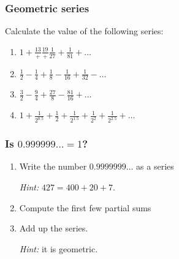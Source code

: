 \documentclass[14pt]{beamer}
\newcommand{\p}{\pause}
\newcommand{\setsize}[1]{\fontsize{#1}{#1}\selectfont} %
\newcommand{\smallerfont}{\setsize{13}} %
\newcommand{\vv}{\vspace{.5cm}}
\begin{document}
	\begin{frame}[t]
		\smallerfont
		\frametitle{Geometric series}

		Calculate the value of the following series:

		\begin{enumerate}
			\item ${\displaystyle 1 + \frac{13}{+} \frac{19}{+} \frac{1}{27} + \frac{1}{81} + \ldots}$
				\vv

			\item ${\displaystyle \frac{1}{2} - \frac{1}{4} + \frac{1}{8} - \frac{1}{16} + \frac{1}{32} - \ldots}$
				\vv

			\item ${\displaystyle \frac{3}{2} - \frac{9}{4} + \frac{27}{8} - \frac{81}{16} + \ldots}$
				\vv

			\item ${\displaystyle  1 + \frac{1}{2^{0.5}} + \frac{1}{2} + \frac{1}{2^{1.5}} + \frac{1}{2^{2}} + \frac{1}{2^{2.5}} + \ldots}$
				\vv
		\end{enumerate}
	\end{frame}
	\begin{frame}[t]
		\frametitle{Is ${\displaystyle 0.999999\ldots = 1}$?}

		\p
		\begin{enumerate}
			\item Write the number \; ${\displaystyle 0.9999999\ldots}$ \; as a series

				\emph{Hint:} ${\displaystyle 427 = 400 + 20 + 7}$. \vv

			\item Compute the first few partial sums \vv

			\item Add up the series.

				\emph{Hint:} it is geometric.
		\end{enumerate}
	\end{frame}
\end{document}
